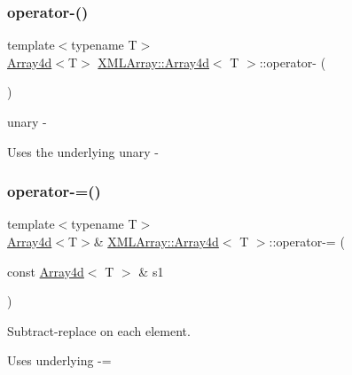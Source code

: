 \subsubsection{\texorpdfstring{operator-\/()}{operator-()}\hspace{0.1cm}{\footnotesize\ttfamily [2/2]}}
{\footnotesize\ttfamily template$<$typename T$>$ \\
\mbox{\hyperlink{classXMLArray_1_1Array4d}{Array4d}}$<$T$>$ \mbox{\hyperlink{classXMLArray_1_1Array4d}{X\+M\+L\+Array\+::\+Array4d}}$<$ T $>$\+::operator-\/ (\begin{DoxyParamCaption}{ }\end{DoxyParamCaption})\hspace{0.3cm}{\ttfamily [inline]}}



unary -\/ 

Uses the underlying unary -\/ \mbox{\label{classXMLArray_1_1Array4d_ad192d15277494d22a81c86852eaa5466}} 
\subsubsection{\texorpdfstring{operator-\/=()}{operator-=()}\hspace{0.1cm}{\footnotesize\ttfamily [1/2]}}
{\footnotesize\ttfamily template$<$typename T$>$ \\
\mbox{\hyperlink{classXMLArray_1_1Array4d}{Array4d}}$<$T$>$\& \mbox{\hyperlink{classXMLArray_1_1Array4d}{X\+M\+L\+Array\+::\+Array4d}}$<$ T $>$\+::operator-\/= (\begin{DoxyParamCaption}\item[{const \mbox{\hyperlink{classXMLArray_1_1Array4d}{Array4d}}$<$ T $>$ \&}]{s1 }\end{DoxyParamCaption})\hspace{0.3cm}{\ttfamily [inline]}}



Subtract-\/replace on each element. 

Uses underlying -\/= \mbox{\label{classXMLArray_1_1Array4d_ad192d15277494d22a81c86852eaa5466}} 
